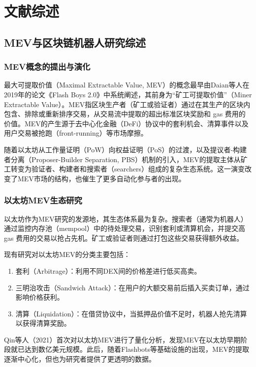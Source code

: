 \cleardoublepage
\newrefsection
\chapter{文献综述}

\section{MEV与区块链机器人研究综述}

\subsection{MEV概念的提出与演化}

\par 最大可提取价值（Maximal Extractable Value, MEV）的概念最早由Daian等人在2019年的论文《Flash Boys 2.0》中系统阐述，其前身为“矿工可提取价值”（Miner Extractable Value）。MEV指区块生产者（矿工或验证者）通过在其生产的区块内包含、排除或重新排序交易，从交易流中提取的超出标准区块奖励和 gas 费用的价值。MEV的产生源于去中心化金融（DeFi）协议中的套利机会、清算事件以及用户交易被抢跑（front-running）等市场摩擦。
\par 随着以太坊从工作量证明（PoW）向权益证明（PoS）的过渡，以及提议者-构建者分离（Proposer-Builder Separation, PBS）机制的引入，MEV的提取主体从矿工转变为验证者、构建者和搜索者（searchers）组成的复杂生态系统。这一演变改变了MEV市场的结构，也催生了更多自动化参与者的出现。

\subsection{以太坊MEV生态研究}

\par 以太坊作为MEV研究的发源地，其生态体系最为复杂。搜索者（通常为机器人）通过监控内存池（mempool）中的待处理交易，识别套利或清算机会，并提交高 gas 费用的交易以抢占先机。矿工或验证者则通过打包这些交易获得额外收益。
\par 现有研究对以太坊MEV的分类主要包括：
\begin{enumerate}
    \item 套利（Arbitrage）：利用不同DEX间的价格差进行低买高卖。
    \item 三明治攻击（Sandwich Attack）：在用户的大额交易前后插入买卖订单，通过影响价格获利。
    \item 清算（Liquidation）：在借贷协议中，当抵押品价值不足时，机器人抢先清算以获得清算奖励。
\end{enumerate}
\par Qin等人（2021）首次对以太坊MEV进行了量化分析，发现MEV在以太坊早期阶段就已达到数亿美元规模。此后，随着Flashbots等基础设施的出现，MEV的提取逐渐中心化，但也为研究者提供了更透明的数据。\cite {123}

